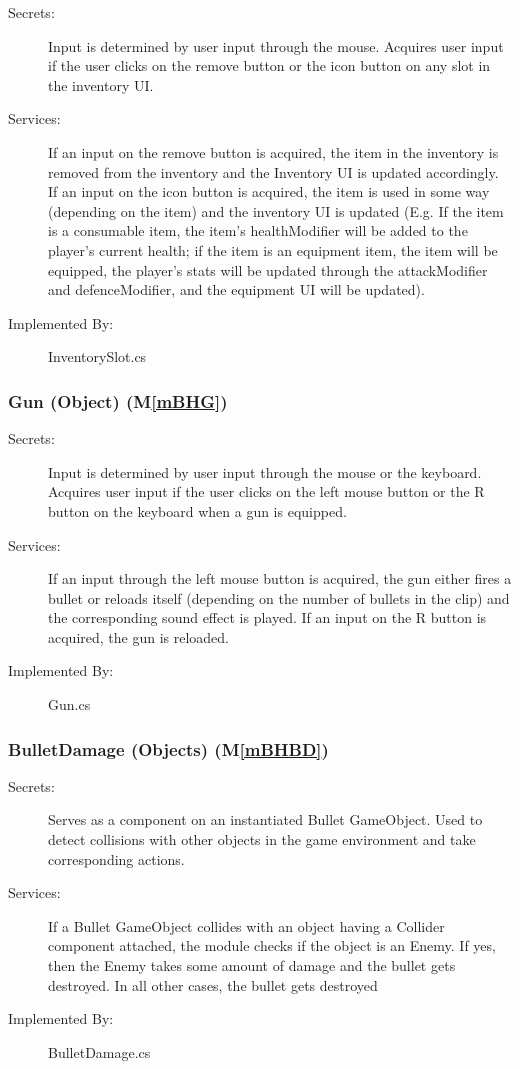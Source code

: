\documentclass[12pt, titlepage]{article}
\newcommand{\mref}[1]{M\ref{#1}}
\begin{document}
\begin{description}
\item[Secrets:] Input is determined by user input through the mouse. Acquires user input if the user clicks on the remove button or the icon button on any slot in the inventory UI.
\item[Services:] If an input on the remove button is acquired, the item in the inventory is removed from the inventory and the Inventory UI is updated accordingly. If an input on the icon button is acquired, the item is used in some way (depending on the item) and the inventory UI is updated (E.g. If the item is a consumable item, the item's healthModifier will be added to the player's current health; if the item is an equipment item, the item will be equipped, the player's stats will be updated through the attackModifier and defenceModifier,  and the equipment UI will be updated).
\item[Implemented By:] InventorySlot.cs
\end{description}

\subsubsection{Gun (Object) (\mref{mBHG})}

\begin{description}
	\item[Secrets:] Input is determined by user input through the mouse or the keyboard. Acquires user input if the user clicks on the left mouse button or the R button on the keyboard when a gun is equipped.
	\item[Services:] If an input through the left mouse button is acquired, the gun either fires a bullet or reloads itself (depending on the number of bullets in the clip) and the corresponding sound effect is played. If an input on the R button is acquired, the gun is reloaded.
	\item[Implemented By:] Gun.cs
\end{description}

\subsubsection{BulletDamage (Objects) (\mref{mBHBD})}

\begin{description}
	\item[Secrets:] Serves as a component on an instantiated Bullet GameObject. Used to detect collisions with other objects in the game environment and take corresponding actions.
	\item[Services:] If a Bullet GameObject collides with an object having a Collider component attached, the module checks if the object is an Enemy. If yes, then the Enemy takes some amount of damage and the bullet gets destroyed. In all other cases, the bullet gets destroyed
	\item[Implemented By:] BulletDamage.cs
\end{description}
\end{document}
